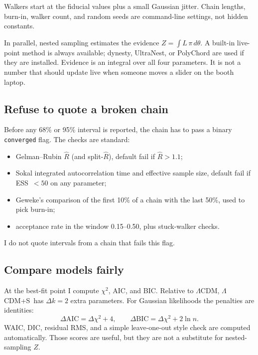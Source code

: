 \documentclass[12pt,letterpaper]{article}
\newcommand{\Lcdms}{$\Lambda$CDM+S}
\begin{document}
Walkers start at the fiducial values plus a small Gaussian jitter.
Chain lengths, burn-in, walker count, and random seeds are
command-line settings, not hidden constants.

In parallel, nested sampling estimates the evidence $Z=\int L\,\pi\,d\theta$.
A built-in live-point method is always available; dynesty, UltraNest,
or PolyChord are used if they are installed. Evidence is an integral
over all four parameters. It is not a number that should update live
when someone moves a slider on the booth laptop.

\subsection{Refuse to quote a broken chain}

Before any 68\% or 95\% interval is reported, the chain has to pass a
binary \texttt{converged} flag. The checks are standard:

\begin{itemize}[leftmargin=1.6em]
  \item Gelman--Rubin $\widehat R$ (and split-$\widehat R$), default
        fail if $\widehat R>1.1$;
  \item Sokal integrated autocorrelation time and effective sample size,
        default fail if ESS~$<50$ on any parameter;
  \item Geweke's comparison of the first 10\% of a chain with the last
        50\%, used to pick burn-in;
  \item acceptance rate in the window 0.15--0.50, plus stuck-walker
        checks.
\end{itemize}

I do not quote intervals from a chain that fails this flag.

\subsection{Compare models fairly}

At the best-fit point I compute $\chi^2$, AIC, and BIC. Relative to
$\Lambda$CDM, \Lcdms\ has $\Delta k=2$ extra parameters. For Gaussian
likelihoods the penalties are identities:
\begin{equation}
  \Delta\mathrm{AIC}=\Delta\chi^2+4,\qquad
  \Delta\mathrm{BIC}=\Delta\chi^2+2\ln n.
\end{equation}
WAIC, DIC, residual RMS, and a simple leave-one-out style check are
computed automatically. Those scores are useful, but they are not a
substitute for nested-sampling $Z$.
\end{document}
